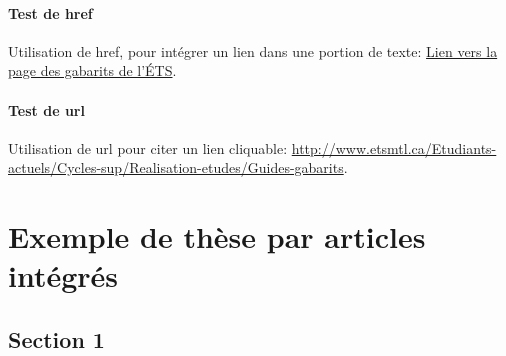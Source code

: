 \documentclass[letterpaper%
, twoside%
, 12pt%
,these%
,french
,creativecommons,hyperref,withAlgo2e%
]{thETS}
\begin{document}
\subsubsection{Test de href}

Utilisation de href, pour intégrer un lien dans une portion de texte:
\href{http://www.etsmtl.ca/Etudiants-actuels/Cycles-sup/Realisation-etudes/Guides-gabarits}{Lien vers la page des gabarits de l'ÉTS}.

\subsubsection{Test de url}

Utilisation de url pour citer un lien cliquable:
\url{http://www.etsmtl.ca/Etudiants-actuels/Cycles-sup/Realisation-etudes/Guides-gabarits}.

\chapter{Exemple de thèse par articles intégrés}



\section{Section 1}

\lipsum[1]

\begin{conclusion}

\lipsum[1] %

\end{conclusion}


\appendix
\end{document}
